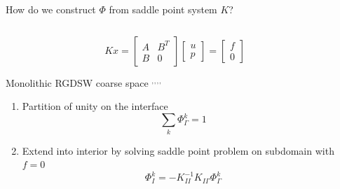 \begin{frame}{How do we construct $\varPhi$ from saddle point system $K$?}
	\begin{columns}
		\begin{column}{0.52\textwidth}
			\vspace{-6mm}
			\begin{equation*}
				Kx = \begin{bmatrix} A & B^T \\ B & 0 \end{bmatrix}\begin{bmatrix}u\\p\end{bmatrix} = \begin{bmatrix}f\\0\end{bmatrix}
			\end{equation*}
			\vspace{-3mm}
			\begin{block}{\normalsize Monolithic RGDSW coarse space \footnotemark[1]$^,$\footnotemark[2]$^,$\footnotemark[3]$^,$\footnotemark[4]$^,$\footnotemark[5]}
				\begin{enumerate}
					\item Partition of unity on the interface \begin{equation*}\sum_k \varPhi_\Gamma^k = 1\end{equation*}
					\item<2-> Extend into interior by solving saddle point problem on subdomain with $f = 0$
					      \begin{equation*}
						      \varPhi_I^k = -K_{II}^{-1}K_{I\Gamma}\varPhi_\Gamma^k
					      \end{equation*}
				\end{enumerate}
				\vspace{-2mm}
			\end{block}
		\end{column}
		\begin{column}{0.52\textwidth}
			\vspace{-10mm}
\end{column}
\end{columns}
\end{frame}
